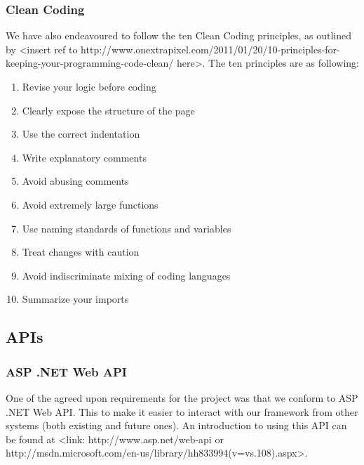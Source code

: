 \documentclass[12pt, a4paper]{article}
\begin{document}
\subsubsection{Clean Coding}
We have also endeavoured to follow the ten Clean Coding principles, as outlined by <insert ref to http://www.onextrapixel.com/2011/01/20/10-principles-for-keeping-your-programming-code-clean/ here>.
The ten principles are as following:
\begin{enumerate}

\item Revise your logic before coding
\item Clearly expose the structure of the page
\item Use the correct indentation
\item Write explanatory comments
\item Avoid abusing comments
\item Avoid extremely large functions
\item Use naming standards of functions and variables
\item Treat changes with caution
\item Avoid indiscriminate mixing of coding languages
\item Summarize your imports

\end{enumerate}

\subsection{APIs}
\subsubsection{ASP .NET Web API}
One of the agreed upon requirements for the project was that we conform to ASP .NET Web API. This to make it easier to interact with our framework from other systems (both existing and future ones). An introduction to using this API can be found at <link: http://www.asp.net/web-api or http://msdn.microsoft.com/en-us/library/hh833994(v=vs.108).aspx>.
\end{document}
